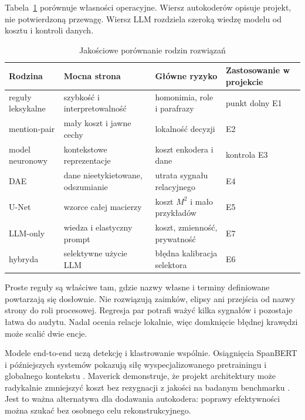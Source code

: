 Tabela~\ref{tab:porownanie-rodzin} porównuje własności operacyjne. Wiersz autokoderów opisuje projekt, nie potwierdzoną przewagę. Wiersz LLM rozdziela szeroką wiedzę modelu od kosztu i kontroli danych.

\begin{table}[htbp]
  \centering
  \caption{Jakościowe porównanie rodzin rozwiązań}
  \label{tab:porownanie-rodzin}
  \begin{tabular}{p{}p{}p{}p{}}
    \toprule
    Rodzina & Mocna strona & Główne ryzyko & Zastosowanie w projekcie \\
    \midrule
    reguły leksykalne & szybkość i interpretowalność & homonimia, role i parafrazy & punkt dolny E1 \\
    mention-pair & mały koszt i jawne cechy & lokalność decyzji & E2 \\
    model neuronowy & kontekstowe reprezentacje & koszt enkodera i dane & kontrola E3 \\
    DAE & dane nieetykietowane, odszumianie & utrata sygnału relacyjnego & E4 \\
    U-Net & wzorce całej macierzy & koszt $M^2$ i mało przykładów & E5 \\
    LLM-only & wiedza i elastyczny prompt & koszt, zmienność, prywatność & E7 \\
    hybryda & selektywne użycie LLM & błędna kalibracja selektora & E6 \\
    \bottomrule
  \end{tabular}
\end{table}

Proste reguły są właściwe tam, gdzie nazwy własne i terminy definiowane powtarzają się dosłownie. Nie rozwiązują zaimków, elipsy ani przejścia od nazwy strony do roli procesowej. Regresja par potrafi ważyć kilka sygnałów i pozostaje łatwa do audytu. Nadal ocenia relacje lokalnie, więc domknięcie błędnej krawędzi może scalić dwie encje.

Modele end-to-end uczą detekcję i klastrowanie wspólnie. Osiągnięcia SpanBERT i późniejszych systemów pokazują siłę wyspecjalizowanego pretrainingu i globalnego kontekstu \cite{joshi_2020_spanbert,otmazgin_2023_lingmess}. Maverick demonstruje, że projekt architektury może radykalnie zmniejszyć koszt bez rezygnacji z jakości na badanym benchmarku \cite{martinelli_2024_maverick}. Jest to ważna alternatywa dla dodawania autokodera: poprawy efektywności można szukać bez osobnego celu rekonstrukcyjnego.

